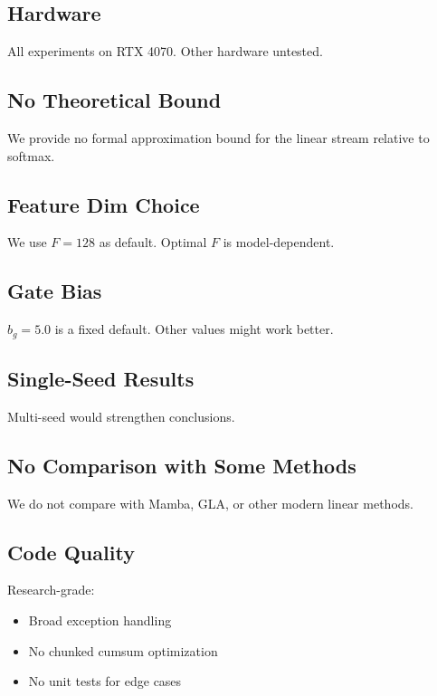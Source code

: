 \subsection{Hardware}

All experiments on RTX 4070. Other hardware untested.

\subsection{No Theoretical Bound}

We provide no formal approximation bound for the linear stream relative to 
softmax.

\subsection{Feature Dim Choice}

We use $F = 128$ as default. Optimal $F$ is model-dependent.

\subsection{Gate Bias}

$b_g = 5.0$ is a fixed default. Other values might work 
better.

\subsection{Single-Seed Results}

Multi-seed would strengthen conclusions.

\subsection{No Comparison with Some Methods}

We do not compare with Mamba, GLA, or other modern linear methods.

\subsection{Code Quality}

Research-grade:
\begin{itemize}
\item Broad exception handling
\item No chunked cumsum optimization
\item No unit tests for edge cases

\end{itemize}
